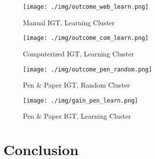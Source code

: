 \documentclass[12pt,twocolumn]{elsarticle}
\begin{document}
\begin{figure*}
\caption{Subset of Clusters}
\label{fig:learning}
\centering
        \begin{subfigure}[b]{0.4\textwidth}
                \centering
                \texttt{[image: ./img/outcome\_web\_learn.png]}
                \caption{\tiny{Manual IGT, Learning Cluster}}
                \label{a}
        \end{subfigure}
        \begin{subfigure}[b]{0.4\textwidth}
                \centering
                \texttt{[image: ./img/outcome\_com\_learn.png]}
                \caption{\tiny{Computerized IGT, Learning Cluster}}
                \label{b}
        \end{subfigure}
        \begin{subfigure}[b]{0.4\textwidth}
                \centering
                \texttt{[image: ./img/outcome\_pen\_random.png]}
                \caption{\tiny{Pen \& Paper IGT, Random Cluster}}
                \label{c}
        \end{subfigure}
        \begin{subfigure}[b]{0.4\textwidth}
                \centering
                \texttt{[image: ./img/gain\_pen\_learn.png]}
                \caption{\tiny{Pen \& Paper IGT, Learning Cluster}}
                \label{d}
        \end{subfigure}
\end{figure*}
\section{Conclusion}
\end{document}
